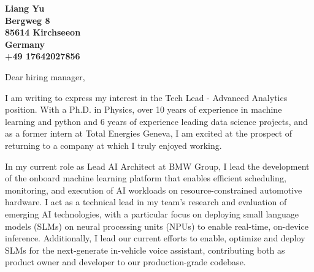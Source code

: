 \documentclass[11pt]{letter} %
\let\raggedleft\raggedright %
\begin{document}

\signature{Liang Yu}                  %
\longindentation=0pt                       %
\let\raggedleft\raggedright                %
 
\begin{letter}{
} 

\begin{center}
\large\bf Liang Yu \\
Bergweg 8\\
85614 Kirchseeon\\ 
Germany\\
+49 17642027856
\end{center} 
\vfill %







\opening{Dear hiring manager,} 
 
I am writing to express my interest in the Tech Lead - Advanced Analytics position. With a Ph.D. in Physics, over 10 years of experience in machine learning and python and 6 years of experience leading data science projects, and as a former intern at Total Energies Geneva, I am excited at the prospect of returning to a company at which I truly enjoyed working.

In my current role as Lead AI Architect at BMW Group, I lead the development of the onboard machine learning platform that enables efficient scheduling, monitoring, and execution of AI workloads on resource-constrained automotive hardware. I act as a technical lead in my team's research and evaluation of emerging AI technologies, with a particular focus on deploying small language models (SLMs) on neural processing units (NPUs) to enable real-time, on-device inference. Additionally, I lead our current efforts to enable, optimize and deploy SLMs for the next-generate in-vehicle voice assistant, contributing both as product owner and developer to our production-grade codebase.  


\end{letter}
\end{document}
